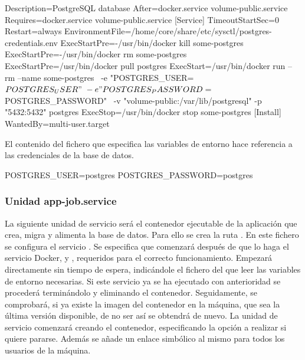 \begin{codelisting}
\label{code:postgresql.service}
\begin{code}
[Unit] 
  Description=PostgreSQL database 
  After=docker.service volume-public.service
  Requires=docker.service volume-public.service
[Service] 
  TimeoutStartSec=0
  Restart=always
  EnvironmentFile=/home/core/share/etc/sysctl/postgres-credentials.env
  ExecStartPre=-/usr/bin/docker kill some-postgres 
  ExecStartPre=-/usr/bin/docker rm some-postgres 
  ExecStartPre=/usr/bin/docker pull postgres 
  ExecStart=/usr/bin/docker run --rm --name some-postgres \
  -e "POSTGRES_USER=${POSTGRES_USER}" \
  -e "POSTGRES_PASSWORD=${POSTGRES_PASSWORD}" \
  -v "volume-public:/var/lib/postgresql" -p "5432:5432" postgres 
  ExecStop=/usr/bin/docker stop some-postgres 
[Install] 
  WantedBy=multi-user.target
\end{code}
\end{codelisting}

El contenido del fichero que especifica las variables de entorno hace referencia a las credenciales de la base de datos.

\begin{codelisting}
\label{code:credentials}
\begin{code}
POSTGRES_USER=postgres
POSTGRES_PASSWORD=postgres
\end{code}
\end{codelisting}

\subsubsection{Unidad app-job.service}

La siguiente unidad de servicio será el contenedor ejecutable de la aplicación que crea, migra y alimenta la base de datos. Para ello se crea la ruta . En este fichero se configura el servicio . Se especifica que comenzará después de que lo haga el servicio Docker,  y , requeridos para el correcto funcionamiento. Empezará directamente sin tiempo de espera, indicándole el fichero del que leer las variables de entorno necesarias. Si este servicio ya se ha ejecutado con anterioridad se procederá terminándolo y eliminando el contenedor. Seguidamente, se comprobará, si ya existe la imagen del contenedor en la máquina, que sea la última versión disponible, de no ser así se obtendrá de nuevo. La unidad de servicio comenzará creando el contenedor, especificando la opción a realizar si quiere pararse. Además se añade un enlace simbólico al mismo para todos los usuarios de la máquina. 

